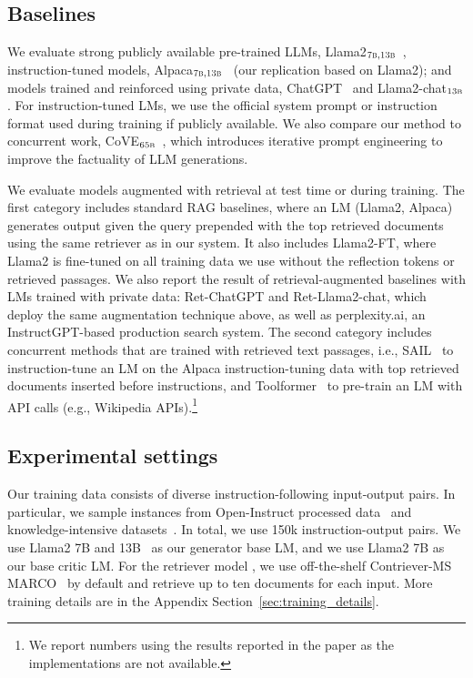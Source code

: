\subsection{Baselines}
We evaluate strong publicly available pre-trained LLMs, Llama2$_{\textsc{7b},\textsc{13b}}$~\citep{touvron2023llama}, instruction-tuned models, Alpaca$_{\textsc{7b},\textsc{13b}}$~\citep{dubois2023alpacafarm} (our replication based on Llama2); and models trained and reinforced using private data, ChatGPT~\citep{ouyang2022training} and Llama2-chat$_{\textsc{13b}}$. 
For instruction-tuned LMs, we use the official system prompt or instruction format used during training if publicly available. 
We also compare our method to concurrent work, CoVE$_\textsc{65b}$~\citep{dhuliawala2023chainofverification}, which introduces iterative prompt engineering to improve the factuality of LLM generations. 

We evaluate models augmented with retrieval at test time or during training. The first category includes standard RAG baselines, where an LM (Llama2, Alpaca) generates output given the query prepended with the top retrieved documents using the same retriever as in our system. It also includes {Llama2-FT}, where Llama2 is fine-tuned on all training data we use without the reflection tokens or retrieved passages.
{We also report the result of retrieval-augmented baselines with LMs trained with private data: Ret-ChatGPT and Ret-Llama2-chat, which deploy the same augmentation technique above, as well as perplexity.ai, an InstructGPT-based production search system. 
}
The second category includes concurrent methods that are trained with retrieved text passages, i.e., { SAIL}~\citep{luo2023sail} to instruction-tune an LM on the Alpaca instruction-tuning data with top retrieved documents inserted before instructions, and {Toolformer}~\citep{schick2023toolformer} to pre-train an LM with API calls (e.g., Wikipedia APIs).\footnote{We report numbers using the results reported in the paper as the implementations are not available.}


\subsection{Experimental settings}
Our training data consists of diverse instruction-following input-output pairs. 
In particular, we sample instances from Open-Instruct processed data~\citep{wang2023far} and knowledge-intensive datasets~\citep{petroni-etal-2021-kilt,stelmakh2022asqa,mihaylov-etal-2018-suit}. 
In total, we use 150k instruction-output pairs. 
We use Llama2 7B and 13B~\citep{touvron2023llama} as our generator base LM, and we use Llama2 7B as our base critic LM. 
For the retriever model \mret, we use off-the-shelf Contriever-MS MARCO~\citep{izacard2021towards} by default and retrieve up to ten documents for each input. 
More training details are in the Appendix Section~\ref{sec:training_details}. 

